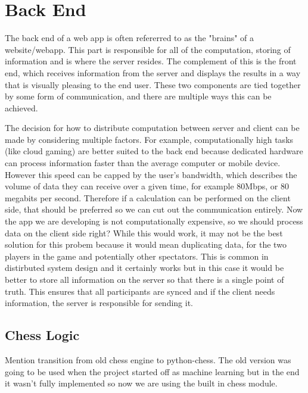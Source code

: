 \section{Back End}

The back end of a web app is often refererred to as the "brains" of a website/webapp. This part is responsible for all of the computation, storing of information and is where the server resides. The complement of this is the front end, which receives information from the server and displays the results in a way that is visually pleasing to the end user. These two components are tied together by some form of communication, and there are multiple ways this can be achieved.


The decision for how to distribute computation between server and client can be made by considering multiple factors. For example, computationally high tasks (like cloud gaming) are better suited to the back end because dedicated hardware can process information faster than the average computer or mobile device. However this speed can be capped by the user's bandwidth, which describes the volume of data they can receive over a given time, for example 80Mbps, or 80 megabits per second. Therefore if a calculation can be performed on the client side, that should be preferred so we can cut out the communication entirely. Now the app we are developing is not computationally expensive, so we should process data on the client side right? While this would work, it may not be the best solution for this probem because it would mean duplicating data, for the two players in the game and potentially other spectators. This is common in distirbuted system design and it certainly works but in this case it would be better to store all information on the server so that there is a single point of truth. This ensures that all participants are synced and if the client needs information, the server is responsible for sending it.

\subsection{Chess Logic}

Mention transition from old chess engine to python-chess. The old version was going to be used when the project started off as machine learning but in the end it wasn't fully implemented so now we are using the built in chess module.

